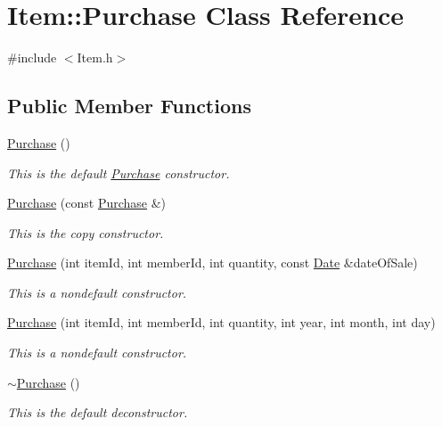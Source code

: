 \hypertarget{class_item_1_1_purchase}{}\section{Item\+:\+:Purchase Class Reference}
\label{class_item_1_1_purchase}


{\ttfamily \#include $<$Item.\+h$>$}

\subsection*{Public Member Functions}
\begin{DoxyCompactItemize}
\item 
\hyperlink{class_item_1_1_purchase_a47dfe2d6fb6c6ff37f0829a6a4ba6459}{Purchase} ()
\begin{DoxyCompactList}\small\item\em This is the default \hyperlink{class_item_1_1_purchase}{Purchase} constructor. \end{DoxyCompactList}\item 
\hyperlink{class_item_1_1_purchase_a38fda0aa01b9b04f5ff3575219c55fa6}{Purchase} (const \hyperlink{class_item_1_1_purchase}{Purchase} \&)
\begin{DoxyCompactList}\small\item\em This is the copy constructor. \end{DoxyCompactList}\item 
\hyperlink{class_item_1_1_purchase_a636485e689fe56fc536a6dbeed8bbf1c}{Purchase} (int item\+Id, int member\+Id, int quantity, const \hyperlink{class_date}{Date} \&date\+Of\+Sale)
\begin{DoxyCompactList}\small\item\em This is a nondefault constructor. \end{DoxyCompactList}\item 
\hyperlink{class_item_1_1_purchase_add77a9a84cb71be28440189ecc243b9a}{Purchase} (int item\+Id, int member\+Id, int quantity, int year, int month, int day)
\begin{DoxyCompactList}\small\item\em This is a nondefault constructor. \end{DoxyCompactList}\item 
\hyperlink{class_item_1_1_purchase_ac65fac4c87bae611fa859cab02ac4f53}{$\sim$\+Purchase} ()
\begin{DoxyCompactList}\small\item\em This is the default deconstructor. \end{DoxyCompactList}\item 

\end{DoxyCompactItemize}
